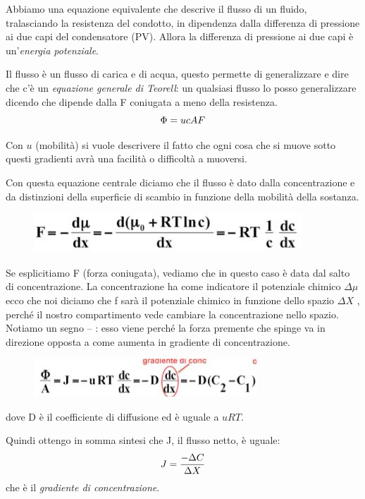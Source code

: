 \documentclass[a4paper,12pt]{article}
\begin{document}
Abbiamo una equazione equivalente che descrive il flusso di un fluido, tralasciando la resistenza del condotto, in dipendenza dalla differenza di pressione ai due capi del condensatore (PV).
Allora la differenza di pressione ai due capi è un’\emph{energia potenziale}.

Il flusso è un flusso di carica e di acqua, questo permette di generalizzare e dire che c'è un \emph{equazione generale di Teorell}: un qualsiasi flusso lo posso generalizzare dicendo che dipende dalla F coniugata a meno della resistenza.
\begin{equation}
\centering
\Phi= u c A F
\end{equation}

Con $u$ (mobilità) si vuole descrivere il fatto che ogni cosa che si muove sotto questi gradienti avrà una facilità o difficoltà a muoversi.

Con questa equazione centrale diciamo che il flusso è dato dalla concentrazione e da distinzioni della superficie di scambio in funzione della mobilità della sostanza.
\begin{figure}[H]
\centering
\includegraphics[scale=0.55]{immagine/F.jpg}
\caption{}
\end{figure}

Se esplicitiamo F (forza coniugata), vediamo che in questo caso è data dal salto di concentrazione.
La concentrazione ha come indicatore il potenziale chimico $\Delta \mu$ ecco che noi diciamo che f sarà il potenziale chimico in funzione dello spazio $\Delta X$ , perché il nostro compartimento vede cambiare la concentrazione nello spazio.
Notiamo un segno – : esso viene perché la forza premente che spinge va in direzione opposta a come aumenta in gradiente di concentrazione.
\begin{figure}[H]
\centering
\includegraphics[scale=0.6]{immagine/fi.jpg}
\caption{}
\end{figure}

dove D è il coefficiente di diffusione ed è uguale a $uRT$.

Quindi ottengo in somma sintesi che J, il flusso netto, è uguale:
\begin{equation}
\centering
J=\frac{- \Delta C}{\Delta X} 
\end{equation} 
che è il \emph{gradiente di concentrazione}.
\end{document}
